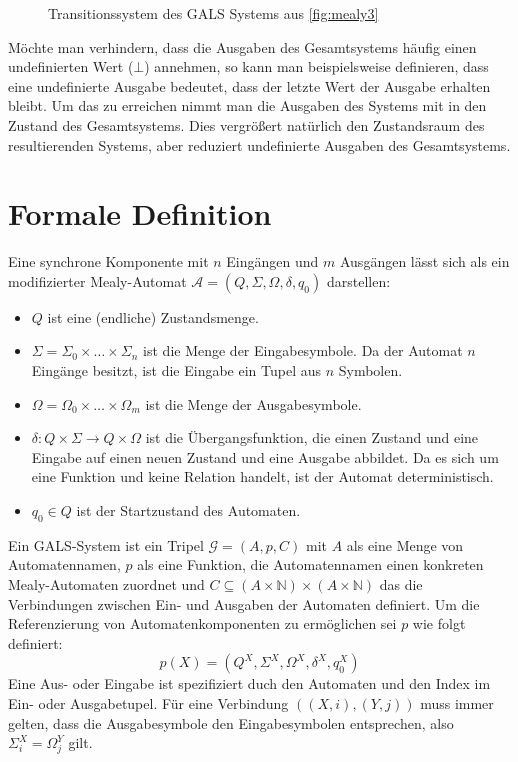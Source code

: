 \begin{figure}[h]
  \centering
  
  \caption{Transitionssystem des GALS Systems aus \ref{fig:mealy3}}
  \label{fig:gals_trans}
\end{figure}

Möchte man verhindern, dass die Ausgaben des Gesamtsystems häufig einen undefinierten Wert ($\bot$) annehmen, so kann man beispielsweise definieren, dass eine undefinierte Ausgabe bedeutet, dass der letzte Wert der Ausgabe erhalten bleibt.
Um das zu erreichen nimmt man die Ausgaben des Systems mit in den Zustand des Gesamtsystems.
Dies vergrößert natürlich den Zustandsraum des resultierenden Systems, aber reduziert undefinierte Ausgaben des Gesamtsystems.

\section{Formale Definition}
\label{sec:gals_formal_definition}
Eine synchrone Komponente mit $n$ Eingängen und $m$ Ausgängen lässt sich als ein modifizierter Mealy-Automat $\mathcal{A} = (Q,\Sigma,\Omega,\delta,q_0)$ darstellen:
\begin{itemize}
  \item $Q$ ist eine (endliche) Zustandsmenge.
  \item $\Sigma = \Sigma_0\times\dots\times\Sigma_n$ ist die Menge der Eingabesymbole.
    Da der Automat $n$ Eingänge besitzt, ist die Eingabe ein Tupel aus $n$ Symbolen.
  \item $\Omega = \Omega_0\times\dots\times\Omega_m$ ist die Menge der Ausgabesymbole.
  \item $\delta : Q\times\Sigma\rightarrow Q\times\Omega$ ist die Übergangsfunktion, die einen Zustand und eine Eingabe auf einen neuen Zustand und eine Ausgabe abbildet.
    Da es sich um eine Funktion und keine Relation handelt, ist der Automat deterministisch.
  \item $q_0\in Q$ ist der Startzustand des Automaten.
\end{itemize}

Ein GALS-System ist ein Tripel $\mathcal{G}=(A,p,C)$ mit $A$ als eine Menge von Automatennamen, $p$ als eine Funktion, die Automatennamen einen konkreten Mealy-Automaten zuordnet und $C\subseteq (A\times\mathbb{N})\times(A\times\mathbb{N})$ das die Verbindungen zwischen Ein- und Ausgaben der Automaten definiert.
Um die Referenzierung von Automatenkomponenten zu ermöglichen sei $p$ wie folgt definiert:
\[ p(X) = (Q^X,\Sigma^X,\Omega^X,\delta^X,q_0^X) \]
Eine Aus- oder Eingabe ist spezifiziert duch den Automaten und den Index im Ein- oder Ausgabetupel.
Für eine Verbindung $((X,i),(Y,j))$ muss immer gelten, dass die Ausgabesymbole den Eingabesymbolen entsprechen, also $\Sigma_i^X = \Omega_j^Y$ gilt.


